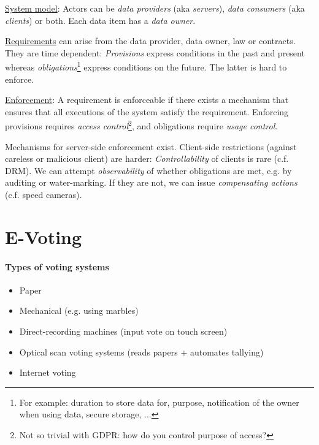 \underline{System model}:
Actors can be \emph{data providers} (aka \emph{servers}), \emph{data consumers} (aka \emph{clients}) or both. Each data item has a \emph{data owner}.

\underline{Requirements} can arise from the data provider, data owner, law or contracts. They are time dependent: \emph{Provisions} express conditions in the past and present whereas \emph{obligations}\footnote{For example: duration to store data for, purpose, notification of the owner when using data, secure storage, ...} express conditions on the future. The latter is hard to enforce.

\underline{Enforcement}: A requirement is enforceable if there exists a mechanism that ensures that all executions of the system satisfy the requirement.
Enforcing provisions requires \emph{access control}\footnote{Not so trivial with GDPR: how do you control purpose of access?}, and obligations require \emph{usage control}.

Mechanisms for server-side enforcement exist. Client-side restrictions (against careless or malicious client) are harder: \emph{Controllability} of clients is rare (c.f. DRM). We can attempt \emph{observability} of whether obligations are met, e.g. by auditing or water-marking. If they are not, we can issue \emph{compensating actions} (c.f. speed cameras).



\newpage
\section{E-Voting}

\paragraph{Types of voting systems}
\begin{itemize}
    \item Paper
    \item Mechanical (e.g. using marbles)
    \item Direct-recording machines (input vote on touch screen)
    \item Optical scan voting systems (reads papers + automates tallying)
    \item Internet voting
\end{itemize}

